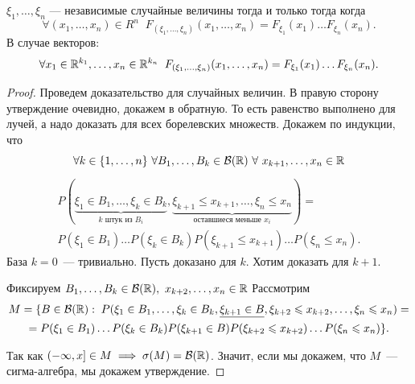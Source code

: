 \begin{theorem}
$\xi_1, \ldots , \xi_n$ --- независимые случайные величины тогда и только тогда когда 
\[\forall (x_1, \ldots , x_n) \in R^{n}\;\;  F_{(\xi_1, \ldots , \xi_n)}(x_1, \ldots , x_n) = F_{\xi_1}(x_1)\ldots  F_{\xi_n}(x_n).\]
В случае векторов:
\[\forall x_1 \in \mathbb{R}^{k_1}, \ldots  ,  x_n \in \mathbb{R}^{k_n}\;\; F_{(\xi_1, \ldots , \xi_n)}(x_1, \ldots , x_n) = F_{\xi_1}(x_1)\ldots F_{\xi_n}(x_n).\]
\begin{proof}
Проведем доказательство для случайных величин. В правую сторону утверждение очевидно, докажем в обратную. То есть равенство выполнено для лучей, а надо доказать для всех борелевских
множеств. Докажем по индукции, что
\[
    \forall k \in \{1, \ldots , n\} \ \forall B_1,\ldots , B_k \in \mathcal{B}(\mathbb{R}) \ \forall \ x_{k+1},\ldots , x_n \in \mathbb{R}
\]
\begin{multline*}
     P(\underbrace{\xi_1 \in B_1,\ldots , \xi_k \in B_k}_{k\text{ штук из }B_i},
     \underbrace{\xi_{k+1} \leqslant x_{k+1}, \ldots , \xi_n \leqslant x_n}_{\text{оставшиеся меньше } x_i}) = \\
     P(\xi_1 \in B_1) \ldots P(\xi_k \in B_k)P( \xi_{k+1} \leqslant x_{k+1}) \ldots  P(\xi_n \leqslant x_n).
\end{multline*}
База $k = 0$~--- тривиально. Пусть доказано для $k$. Хотим доказать для $k+1$.

Фиксируем $B_1, \ldots , B_k \in \B(\R), \ x_{k+2}, \ldots , x_n \in \R$
Рассмотрим 
\begin{multline*}
M = \{B \in \mathcal{B}(\mathbb{R}):\;P(\xi_1 \in B_1,\ldots, \xi_{k} \in B_k, \underline{\xi_{k+1} \in B},\xi_{k+2} \leqslant x_{k+2}, \ldots , \xi_n \leqslant x_n) =\\
 = P(\xi_1 \in B_1)\ldots P(\xi_k \in B_k)P(\xi_{k+1} \in B) P(\xi_{k+2} \leqslant x_{k+2})\ldots P(\xi_{n} \leqslant x_{n})\}.
\end{multline*}

Так как $(-\infty, x] \in M \implies \sigma(M) = \mathcal{B}(\mathbb{R})$. Значит, если мы докажем, что $M$~--- сигма-алгебра, мы докажем утверждение.


\end{proof}
\end{theorem}
